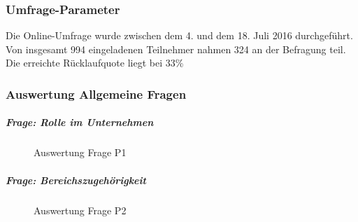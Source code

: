 \documentclass[../../main.tex]{subfiles}
\begin{document}
\subsubsection*{Umfrage-Parameter}

\begin{sloppypar}
Die Online-Umfrage wurde zwischen dem 4. und dem 18. Juli 2016 durchgeführt. Von insgesamt 994 eingeladenen Teilnehmer nahmen 324 an der Befragung teil. Die erreichte Rücklaufquote liegt bei 33\%
\end{sloppypar}

\subsubsection*{Auswertung Allgemeine Fragen}

\subparagraph*{Frage: Rolle im Unternehmen}\mbox{}
\begin{figure}[H]
\centering
{}
\caption{Auswertung Frage P1}
\label{P1}
\end{figure}

\subparagraph*{Frage: Bereichszugehörigkeit}\mbox{}
\begin{figure}[H]
\centering
{}
\caption{Auswertung Frage P2}
\label{P2}
\end{figure}
\end{document}
